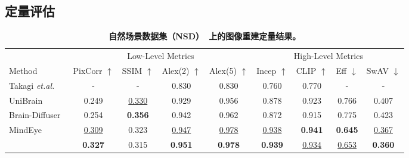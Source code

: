 \subsection{定量评估}

\begin{table}[t]
\setlength{\tabcolsep}{9pt}
\renewcommand{\arraystretch}{1.1}
\centering
\caption{\textbf{自然场景数据集（NSD）~\cite{allen2022massive}上的图像重建定量结果。}}
\label{table:rec}
\begin{tabular}{lcccccccc}
\toprule
 & \multicolumn{4}{c}{Low-Level Metrics} & \multicolumn{4}{c}{High-Level Metrics} \\
\cmidrule(lr){2-5} \cmidrule(lr){6-9}
Method & PixCorr $\uparrow$ & SSIM $\uparrow$ & Alex(2) $\uparrow$ & Alex(5) $\uparrow$ & Incep $\uparrow$ & CLIP $\uparrow$ & Eff $\downarrow$ & SwAV $\downarrow$ \\
\midrule
Takagi \emph{et.al.}~\cite{takagi2023high} & - & - & 0.830 & 0.830 & 0.760 & 0.770 & - & - \\
UniBrain~\cite{mai2023unibrain} & 0.249 & \underline{0.330} & 0.929 & 0.956 & 0.878 & 0.923 & 0.766 & 0.407 \\
Brain-Diffuser~\cite{ozcelik2023brain} & 0.254 & \textbf{0.356} & 0.942 & 0.962 & 0.872 & 0.915 & 0.775 & 0.423 \\
MindEye~\cite{scotti2023reconstructing} & \underline{0.309} & 0.323 & \underline{0.947} & \underline{0.978} & \underline{0.938} & \textbf{0.941} & \textbf{0.645} & \underline{0.367} \\
\hline
\rowcolor{mygrey} \textbf{\model{}} & \textbf{0.327} &  0.315 & \textbf{0.951} & \textbf{0.978} & \textbf{0.939} & \underline{0.934} & \underline{0.653} & \textbf{0.360} \\
\bottomrule
\end{tabular}
\end{table}



